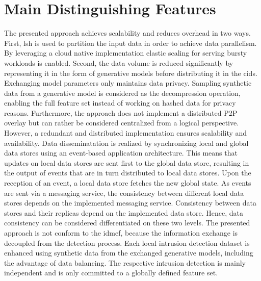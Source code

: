 \documentclass[../../main.tex]{subfiles}
\begin{document}
\section{Main Distinguishing Features}

The presented approach achieves scalability and reduces overhead in two ways. First, \gls{lsh} is used to partition the input data in order to achieve data parallelism. By leveraging a cloud native implementation elastic scaling for serving bursty workloads is enabled. Second, the data volume is reduced significantly by representing it in the form of generative models before distributing it in the \gls{cids}. Exchanging model parameters only maintains data privacy. Sampling synthetic data from a generative model is considered as the decompression operation, enabling the full feature set instead of working on hashed data for privacy reasons. Furthermore, the approach does not implement a distributed P2P overlay but can rather be considered centralized from a logical perspective. However, a redundant and distributed implementation ensures scalability and availability. Data disseminatation is realized by synchronizing local and global data stores using an event-based application architecture. This means that updates on local data stores are sent first to the global data store, resulting in the output of events that are in turn distributed to local data stores. Upon the reception of an event, a local data store fetches the new global state. As events are sent via a messaging service, the consistency between different local data stores depends on the implemented messaging service. Consistency between data stores and their replicas depend on the implemented data store. Hence, data consistency can be considered differentiated on these two levels. The presented approach is not conform to the \gls{idmef}, because the information exchange is decoupled from the detection process. Each local intrusion detection dataset is enhanced using synthetic data from the exchanged generative models, including the advantage of data balancing. The respective intrusion detection is mainly independent and is only committed to a globally defined feature set.
\end{document}
